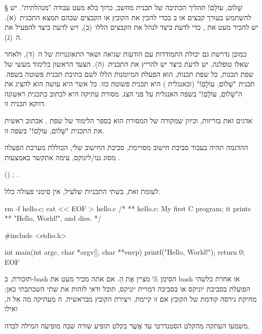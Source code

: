 \def\Title{ניתוח לקסיקלי וסיגווג האסימונים}


§ שָׁלוֹם, עוֹלָם!
תהליך הכתיבה של תכנית מחשב, כרוך בלא מעט עבודה "מנהלתית". יש להשתמש בעורך קבצים
או ב בכדי להכין את הקובץ או הקבצים שבהם תמצא
התכנית~(א). יש להכיר מעט את , כדי לדעת כיצד
לנהל את הקבצים הללו~(ב), ויש לדעת כיצד להפעיל את ה~(ג).

כמובן נדרשת גם יכולת התמודדות עם הודעות שגיאה ושאר התאוננויות של ה~(ד),
ולאחר שאלו טופלנה, יש לדעת כיצד יש להריץ את התכנית~(ה). הצעד הראשון בלימוד מעשי
של שפת תכנות, כל שפת תכנות, הוא הפעלת המיומנות הללו לשם כתיבת תכנית פשוטה בשפה.
תכנית "שָׁלוֹם, עוֹלָם!" (ובאנגלית ) היא תכנית פשוטה
כזו. כל אשר היא עושה הוא להציג את ה "שָׁלוֹם, עוֹלָם!" בשפה האנגלית על פני
הצג.  מסורת עתיקה היא לכתוב כתכנית ראשונה דווקא תכנית זו.

אדגים זאת בזריזות, וכיוון שמקורה של המסורת הוא בספר הלימוד של שפת , אכתוב
ראשית את התכנית "שָׁלוֹם, עוֹלָם!" בשפה זו.

ההדגמה תהיה בעבור סביבת חישוב מסויימת, סביבת החישוב שלי, הכוללת
מערכת הפעלה מסוג גנו/לינוקס, עימה אתקשר באמצעות  .

\begin{english}
\let\ttfamily=\listingsfont
\begin{CPP}
() ; .
\end{CPP}
\end{english}
לעומת זאת, בשתי התכניות שלעיל, אין סימני פעולה כלל.
\begin{קוד}
\bash[verbose,script,scriptFile=make-hello-c.sh]
rm -f hello.c; cat << EOF > hello.c
/*
** hello.c: My first C program; it prints
** "Hello, World!", and dies.
*/

#include <stdio.h>

int main(int argc, char *argv[], char **envp) {
  printf("Hello, World!\n");
  return 0;
}
EOF
\END
\end{קוד}

{
  \noindent\hrulefill

  תזכורת, ב-bash הסימן \% מציין אֶת הַ. אם אתה מכיר מעט את bash או
  אחרת כלשהי הפועלת בסביבת יוניקס או בסביבה דמויית יוניקס, תוכל ודאי
  לזהות את שתי ה שכתבתי כאן: מחיקת גירסה קודמת של הקובץ אם זו קיימת,
  ויצירת הקובץ מבראשית. ה  מעתיקה מה אל ה, ואילו 
  \begin{קוד}
  \end{קוד}
  משמעו העתקה מהקלט הסטנדרטי עד אֲשֶׁר בקלט תופיע שורה שבה מופיעה המילה
   לבדה.

  \par\noindent\hrulefill}

